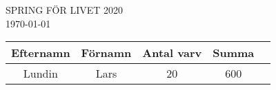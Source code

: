 \documentclass{article}
\begin{document}
\begin{center}
    \Huge\textsc{SPRING FÖR LIVET 2020} \normalsize \\
    \vspace{5ex}
    \Huge\today \normalsize \\
    \vspace{6ex}
        
        \Huge
        \begin{tabular}{|c|c|c|c|c|}
            \hline 
            \textbf{Efternamn} & \textbf{Förnamn} & \textbf{Antal varv} & \textbf{Summa} \\
            \hline 
            \hline
		Lundin & Lars & 20 & 600\\
		\hline
            \hline
        \end{tabular}
    \end{center}
\end{document}
